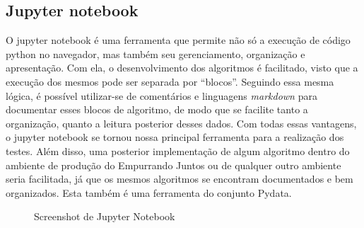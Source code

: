 \subsection{Jupyter notebook}

O jupyter notebook é uma ferramenta que permite não só a execução de código python no navegador, mas também seu gerenciamento, organização e apresentação. Com ela, o desenvolvimento dos algoritmos é facilitado, visto que a execução dos mesmos pode ser separada por “blocos”. Seguindo essa mesma lógica, é possível utilizar-se de comentários e linguagens \textit{markdown} para documentar esses blocos de algoritmo, de modo que se facilite tanto a organização, quanto a leitura posterior desses dados. Com todas essas vantagens, o jupyter notebook se tornou nossa principal ferramenta para a realização dos testes. Além disso, uma posterior implementação de algum algoritmo dentro do ambiente de produção do Empurrando Juntos ou de qualquer outro ambiente seria facilitada, já que os mesmos algoritmos se encontram documentados e bem organizados. Esta também é uma ferramenta do conjunto Pydata.

\begin{figure}[!htb]
    \caption{\label{fig:jupyter} Screenshot de Jupyter Notebook}
\end{figure}